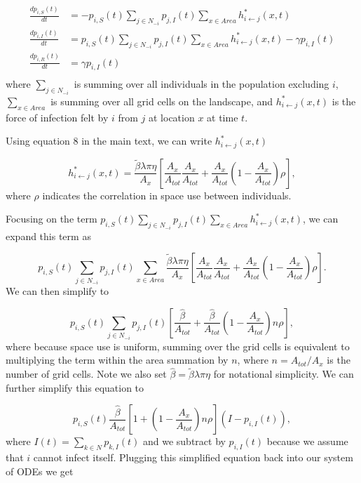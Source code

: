 \documentclass[11pt]{article}
\begin{document}
\begin{equation}
    \begin{aligned}
        \frac{d p_{i, S}(t)}{dt} &= -p_{i, S}(t) \sum_{j \in N_{-i}} p_{j, I}(t) \sum_{x \in Area} h_{i \leftarrow j}^*(x, t) \\
        \frac{d p_{i, I}(t)}{dt} &= p_{i, S}(t) \sum_{j \in N_{-i}} p_{j, I}(t)  \sum_{x \in Area} h_{i \leftarrow j}^*(x, t) - \gamma p_{i, I}(t) \\
        \frac{d p_{i, R}(t)}{dt} &= \gamma p_{i, I}(t) \\
    \end{aligned}
    \label{eq:sir_individual}
\end{equation}
where $\sum_{j \in N_{-i}}$ is summing over all individuals in the population excluding $i$, $\sum_{x \in Area}$ is summing over all grid cells on the landscape, and $h^*_{i \leftarrow j}(x, t)$ is the force of infection felt by $i$ from $j$ at location $x$ at time $t$.

Using equation 8 in the main text, we can write $h^*_{i \leftarrow j}(x, t)$

$$
h^*_{i \leftarrow j}(x, t) = \frac{\tilde{\beta} \lambda \pi \eta}{A_x} \left[\frac{A_x}{A_{tot}}\frac{A_x}{A_{tot}} + \frac{A_x}{A_{tot}}(1 - \frac{A_x}{A_{tot}}) \rho \right],
$$
where $\rho$ indicates the correlation in space use between individuals. 

Focusing on the term $p_{i, S}(t) \sum_{j \in N_{-i}} p_{j, I}(t) \sum_{x \in Area} h_{i \leftarrow j}^*(x, t)$, we can expand this term as

$$
p_{i, S}(t) \sum_{j \in N_{-i}} p_{j, I}(t) \sum_{x \in Area} \frac{\tilde{\beta} \lambda \pi \eta}{A_x} \left[\frac{A_x}{A_{tot}}\frac{A_x}{A_{tot}} + \frac{A_x}{A_{tot}}(1 - \frac{A_x}{A_{tot}}) \rho \right].
$$
We can then simplify to

$$
p_{i, S}(t) \sum_{j \in N_{-i}} p_{j, I}(t)  \left[\frac{\hat{\beta}}{A_{tot}} + \frac{\hat{\beta}}{A_{tot}}(1 - \frac{A_x}{A_{tot}}) n \rho \right],
$$
where because space use is uniform, summing over the grid cells is equivalent to multiplying the term within the area summation by $n$, where $n = A_{tot} / A_x$ is the number of grid cells. Note we also set $\hat{\beta} = \tilde{\beta} \lambda \pi \eta$ for notational simplicity. We can further simplify this equation to

$$
p_{i, S}(t) \frac{\hat{\beta}}{A_{tot}} \left[1 + (1 - \frac{A_x}{A_{tot}}) n \rho \right] (I - p_{i, I}(t)),
$$
where $I(t) = \sum_{k \in N} p_{k, I}(t)$ and we subtract by $p_{i, I}(t)$ because we assume that $i$ cannot infect itself. Plugging this simplified equation back into our system of ODEs we get
\end{document}
